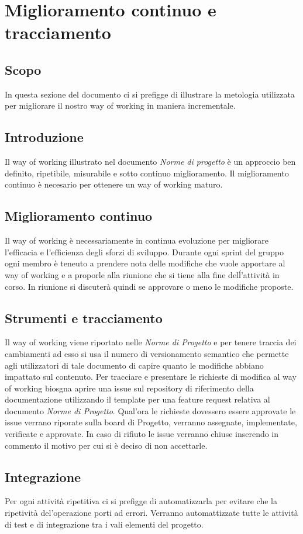 \section{Miglioramento continuo e tracciamento}

\subsection{Scopo}
In questa sezione del documento ci si prefigge di illustrare la metologia utilizzata
per migliorare il nostro way of working in maniera incrementale.

\subsection{Introduzione}
Il way of working illustrato nel documento \textit{Norme di progetto} è un approccio
ben definito, ripetibile, misurabile e sotto continuo miglioramento.
Il miglioramento continuo è necesario per ottenere un way of working maturo.

\subsection{Miglioramento continuo}
Il way of working è necessariamente in continua evoluzione per migliorare l'efficacia
e l'efficienza degli sforzi di sviluppo.
Durante ogni sprint del gruppo ogni membro è teneuto a prendere nota delle modifiche
che vuole apportare al way of working e a proporle alla riunione che si tiene alla
fine delĺ'attività in corso.
In riunione si discuterà quindi se approvare o meno le modifiche proposte.
\subsection{Strumenti e tracciamento}
Il way of working viene riportato nelle \textit{Norme di Progetto}%
e per tenere traccia dei cambiamenti ad esso si usa il numero di versionamento semantico
che permette agli utilizzatori di tale documento di capire quanto le modifiche abbiano
impattato sul contenuto.
Per tracciare e presentare le richieste di modifica al way of working biosgna aprire
una issue sul repository di riferimento della documentazione utilizzando il template
per una feature request relativa al documento \textit{Norme di Progetto}.
Qual'ora le richieste dovessero essere approvate le issue verrano riporate sulla
board di Progetto, verranno assegnate, implementate, verificate e approvate.
In caso di rifiuto le issue verranno chiuse inserendo in commento il motivo per cui
si è deciso di non accettarle.

\subsection{Integrazione}
Per ogni attività ripetitiva ci si prefigge di automatizzarla per evitare che la
ripetività del'operazione porti ad errori.
Verranno automattizzate tutte le attività di test e di integrazione tra i vali
elementi del progetto.
